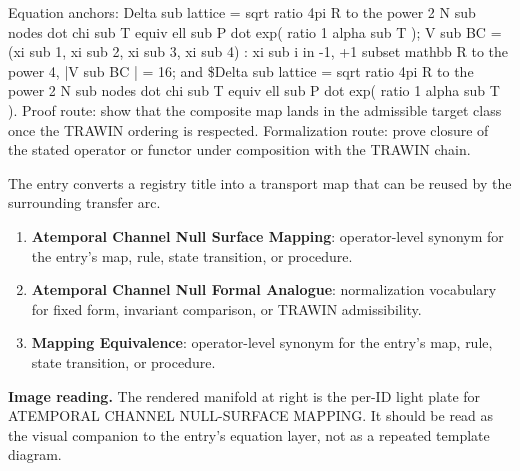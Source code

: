 Equation anchors: Delta sub lattice = sqrt ratio 4pi R to the power 2 N sub nodes dot chi sub T equiv ell sub P dot exp( ratio 1 alpha sub T ); V sub BC = (xi sub 1, xi sub 2, xi sub 3, xi sub 4) : xi sub i in -1, +1 subset mathbb R to the power 4, |V sub BC | = 16; and \$Delta sub lattice = sqrt ratio 4pi R to the power 2 N sub nodes dot chi sub T equiv ell sub P dot exp( ratio 1 alpha sub T ). Proof route: show that the composite map lands in the admissible target class once the TRAWIN ordering is respected. Formalization route: prove closure of the stated operator or functor under composition with the TRAWIN chain.

The entry converts a registry title into a transport map that can be reused by the surrounding transfer arc.
\endgroup

\begin{enumerate}[leftmargin=1.6em,itemsep=6pt,topsep=4pt]
\item \textbf{Atemporal Channel Null Surface Mapping}: operator-level synonym for the entry's map, rule, state transition, or procedure.
\item \textbf{Atemporal Channel Null Formal Analogue}: normalization vocabulary for fixed form, invariant comparison, or TRAWIN admissibility.
\item \textbf{Mapping Equivalence}: operator-level synonym for the entry's map, rule, state transition, or procedure.
\end{enumerate}

\begin{samepage}
\noindent\begin{minipage}[t]{0.45\linewidth}
\vspace{0pt}
\raggedright
\scriptsize\textbf{Image reading.} The rendered manifold at right is the per-ID light plate for ATEMPORAL CHANNEL NULL-SURFACE MAPPING. It should be read as the visual companion to the entry's equation layer, not as a repeated template diagram.\par
\end{minipage}\hfill
\begin{minipage}[t]{0.53\linewidth}
\vspace*{-0.10in}
\raggedright
{}
\end{minipage}
\end{samepage}

\clearpage

